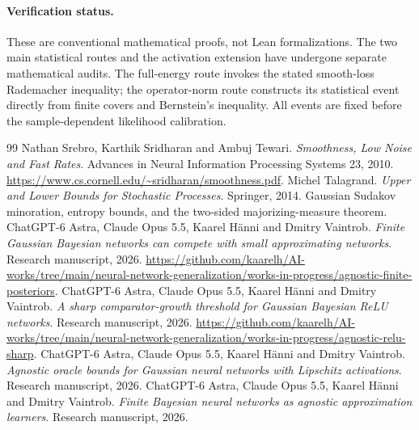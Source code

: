 \documentclass[11pt]{article}
\theoremstyle{definition}\newtheorem{definition}[theorem]{Definition}
\theoremstyle{remark}\newtheorem{remark}[theorem]{Remark}
\begin{document}
\paragraph{Verification status.}
These are conventional mathematical proofs, not Lean formalizations. The two main statistical routes and the activation extension have undergone separate mathematical audits. The full-energy route invokes the stated smooth-loss Rademacher inequality; the operator-norm route constructs its statistical event directly from finite covers and Bernstein's inequality. All events are fixed before the sample-dependent likelihood calibration.

\appendix



\begin{thebibliography}{99}
 Nathan Srebro, Karthik Sridharan and Ambuj Tewari.
\emph{Smoothness, Low Noise and Fast Rates}. Advances in Neural Information Processing Systems 23, 2010.
\url{https://www.cs.cornell.edu/~sridharan/smoothness.pdf}.
 Michel Talagrand. \emph{Upper and Lower Bounds for Stochastic Processes}. Springer, 2014. Gaussian Sudakov minoration, entropy bounds, and the two-sided majorizing-measure theorem.
 ChatGPT-6 Astra, Claude Opus 5.5, Kaarel H\"anni and Dmitry Vaintrob.
\emph{Finite Gaussian Bayesian networks can compete with small approximating networks}. Research manuscript, 2026.
\url{https://github.com/kaarelh/AI-works/tree/main/neural-network-generalization/works-in-progress/agnostic-finite-posteriors}.
 ChatGPT-6 Astra, Claude Opus 5.5, Kaarel H\"anni and Dmitry Vaintrob.
\emph{A sharp comparator-growth threshold for Gaussian Bayesian ReLU networks}. Research manuscript, 2026.
\url{https://github.com/kaarelh/AI-works/tree/main/neural-network-generalization/works-in-progress/agnostic-relu-sharp}.
 ChatGPT-6 Astra, Claude Opus 5.5, Kaarel H\"anni and Dmitry Vaintrob.
\emph{Agnostic oracle bounds for Gaussian neural networks with Lipschitz activations}. Research manuscript, 2026.
 ChatGPT-6 Astra, Claude Opus 5.5, Kaarel H\"anni and Dmitry Vaintrob.
\emph{Finite Bayesian neural networks as agnostic approximation learners}. Research manuscript, 2026.
\end{thebibliography}
\end{document}
